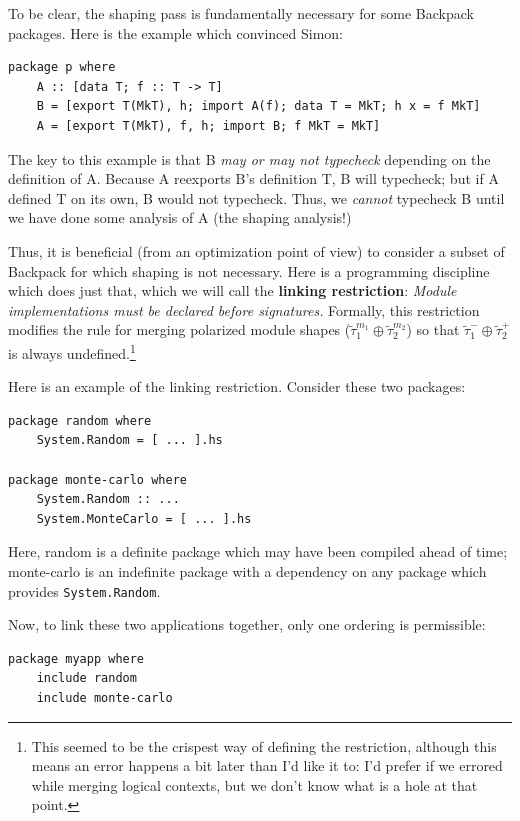 \documentclass{article}
\begin{document}
To be clear, the shaping pass is fundamentally necessary for some
Backpack packages.  Here is the example which convinced Simon:

\begin{verbatim}
package p where
    A :: [data T; f :: T -> T]
    B = [export T(MkT), h; import A(f); data T = MkT; h x = f MkT]
    A = [export T(MkT), f, h; import B; f MkT = MkT]
\end{verbatim}

The key to this example is that B \emph{may or may not typecheck} depending
on the definition of A. Because A reexports B's definition T, B will
typecheck; but if A defined T on its own, B would not typecheck.  Thus,
we \emph{cannot} typecheck B until we have done some analysis of A (the
shaping analysis!)

Thus, it is beneficial (from an optimization point of view) to
consider a subset of Backpack for which shaping is not necessary.
Here is a programming discipline which does just that, which we will call the \textbf{linking restriction}: \emph{Module implementations must be declared before
signatures.}  Formally, this restriction modifies the rule for merging
polarized module shapes ($\widetilde{\tau}_1^{m_1} \oplus \widetilde{\tau}_2^{m_2}$) so that
$\widetilde{\tau}_1^- \oplus \widetilde{\tau}_2^+$ is always undefined.\footnote{This seemed to be the crispest way of defining the restriction, although this means an error happens a bit later than I'd like it to: I'd prefer if we errored while merging logical contexts, but we don't know what is a hole at that point.}

Here is an example of the linking restriction. Consider these two packages:

\begin{verbatim}
package random where
    System.Random = [ ... ].hs

package monte-carlo where
    System.Random :: ...
    System.MonteCarlo = [ ... ].hs
\end{verbatim}

Here, random is a definite package which may have been compiled ahead
of time; monte-carlo is an indefinite package with a dependency
on any package which provides \verb|System.Random|.

Now, to link these two applications together, only one ordering
is permissible:

\begin{verbatim}
package myapp where
    include random
    include monte-carlo
\end{verbatim}
\end{document}
